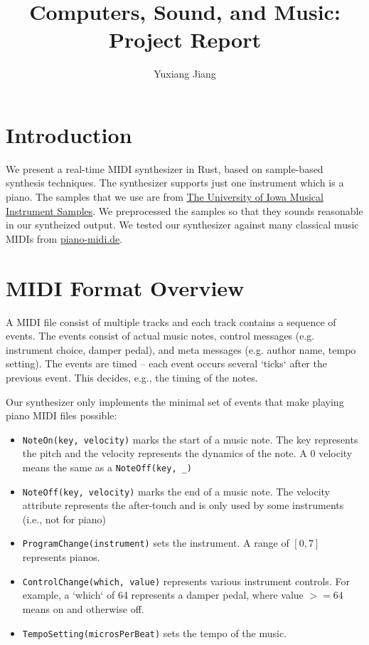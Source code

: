 \documentclass{article}
\begin{document}
\title{Computers, Sound, and Music: Project Report}
\author[]{Yuxiang Jiang}
\maketitle

\section{Introduction}

We present a real-time MIDI synthesizer in Rust, based on sample-based
synthesis techniques.
The synthesizer supports just one instrument which is a piano. The samples
that we use are from
\href{http://theremin.music.uiowa.edu/MIS.html}
  {The University of Iowa Musical Instrument Samples}. We preprocessed
the samples so that they sounds reasonable in our syntheized output.
We tested our synthesizer against many classical music MIDIs
from \href{http://www.piano-midi.de/}{piano-midi.de}.

\section{MIDI Format Overview}

A MIDI file consist of multiple tracks and each track contains a sequence
of events. The events consist of actual music notes,
control messages (e.g. instrument choice, damper pedal),
and meta messages (e.g. author name, tempo setting). The events
are timed -- each event occurs several `ticks` after the previous event.
This decides, e.g., the timing of the notes.

Our synthesizer only implements the minimal set of events that make playing
piano MIDI files possible:

\begin{itemize}
  \item \texttt{NoteOn(key, velocity)} marks the start of a music note.
    The key represents the pitch and the velocity represents the dynamics
    of the note. A 0 velocity means the same as a \texttt{NoteOff(key, \_)}

  \item \texttt{NoteOff(key, velocity)} marks the end of a music note.
    The velocity attribute represents the after-touch and is only used
    by some instruments (i.e., not for piano)

  \item \texttt{ProgramChange(instrument)} sets the instrument.
    A range of $[0,7]$ represents pianos.

  \item \texttt{ControlChange(which, value)} represents various instrument
    controls. For example, a `which` of 64 represents a damper pedal, where
    value $>= 64$ means on and otherwise off.

  \item \texttt{TempoSetting(microsPerBeat)} sets the tempo of the music.
\end{itemize}
\end{document}
